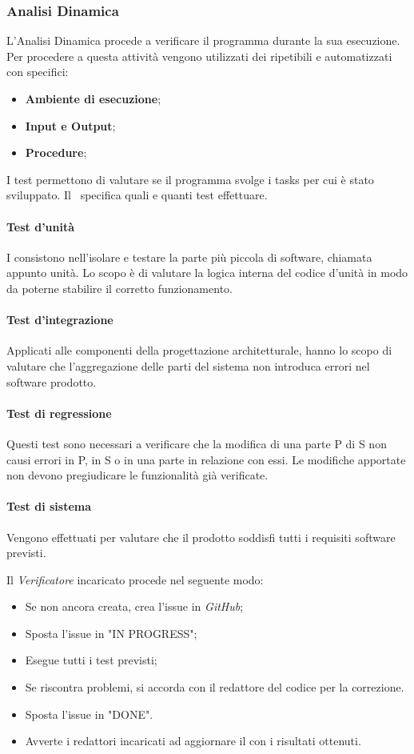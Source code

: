 \subsubsection{Analisi Dinamica}
L'Analisi Dinamica procede a verificare il programma durante la sua esecuzione. Per procedere a questa attività vengono utilizzati dei  ripetibili e automatizzati con specifici:
\begin{itemize}
	\item \textbf{Ambiente di esecuzione};
	\item \textbf{Input e Output};
	\item \textbf{Procedure};
\end{itemize}

\label{Tests}
I test permettono di valutare se il programma svolge i tasks per cui è stato sviluppato. Il \PdQv{}\ specifica quali e quanti test effettuare.
\paragraph*{Test d'unità}
I  consistono nell'isolare e testare la parte più piccola di software, chiamata appunto unità. Lo scopo è di valutare la logica interna del codice d'unità in modo da poterne stabilire il corretto funzionamento. 
\paragraph*{Test d'integrazione}
Applicati alle componenti della progettazione architetturale, hanno lo scopo di valutare che l'aggregazione delle parti del sistema non introduca errori nel software prodotto.
\paragraph*{Test di regressione}
Questi test sono necessari a verificare che la modifica di una parte P di S non causi errori in P, in S o in una parte in relazione con essi. Le modifiche apportate non devono pregiudicare le funzionalità già verificate. 
\paragraph*{Test di sistema}
Vengono effettuati per valutare che il prodotto soddisfi tutti i requisiti software previsti.

\label{ProceduraVerifica}
Il \textit{Verificatore} incaricato procede nel seguente modo:
\begin{itemize}
	\item Se non ancora creata, crea l'issue in \textit{GitHub};
	\item Sposta l'issue in "IN PROGRESS";
	\item Esegue tutti i test previsti;
	\item Se riscontra problemi, si accorda con il redattore del codice per la correzione. 
	\item Sposta l'issue in "DONE".
	\item Avverte i redattori incaricati ad aggiornare il  con i risultati ottenuti.
\end{itemize}